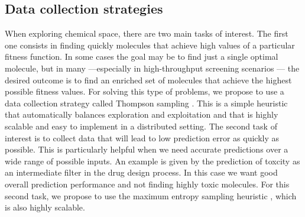 \subsection{Data collection strategies}

When exploring chemical space, there are two main tasks of interest. The first one consists in finding quickly molecules that achieve high values of a particular fitness function. In some cases the goal may be to find just a single optimal molecule, but in many ---especially in high-throughput screening scenarios \cite{Pyzer_Knapp_2015a}--- the desired outcome is to find 
an enriched set of molecules that achieve the highest possible fitness values. For solving this type of problems, we propose to use a data collection strategy called Thompson sampling \cite{Thompson_1933}. This is a simple heuristic that automatically balances exploration and exploitation \cite{Chapelle2011} and that is highly scalable and easy to implement in a distributed setting.
The second task of interest is to collect data that will lead to low prediction error as quickly as possible. This is particularly helpful when we need accurate predictions over a wide range of possible inputs. An example is given by the prediction of toxcity as an intermediate filter in the drug design process. In this case we want good overall prediction performance and not finding highly toxic molecules. For this second task, we propose to use the maximum entropy sampling heuristic \cite{MacKay_1992}, which is also highly scalable.